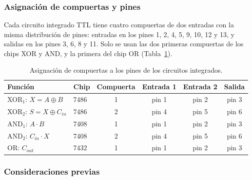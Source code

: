 \documentclass[10pt]{article}
\begin{document}
\subsubsection{Asignación de compuertas y pines}

Cada circuito integrado TTL tiene cuatro compuertas de dos entradas con la misma
distribución de pines: entradas en los pines 1, 2, 4, 5, 9, 10, 12 y 13, y
salidas en los pines 3, 6, 8 y 11. Solo se usan las dos primeras compuertas de
los chips XOR y AND, y la primera del chip OR (Tabla~\ref{tab:pines}).

\begin{table}[!htbp]
  \centering
  \caption{Asignación de compuertas a los pines de los circuitos integrados.}
  \label{tab:pines}
  \begin{tabular}{llcccc}
    \toprule
    Función & Chip & Compuerta & Entrada 1 & Entrada 2 & Salida \\
    \midrule
    XOR$_1$: $X = A \oplus B$          & 7486 & 1 & pin 1 & pin 2 & pin 3 \\
    XOR$_2$: $S = X \oplus C_{in}$     & 7486 & 2 & pin 4 & pin 5 & pin 6 \\
    AND$_1$: $A \cdot B$               & 7408 & 1 & pin 1 & pin 2 & pin 3 \\
    AND$_2$: $C_{in} \cdot X$          & 7408 & 2 & pin 4 & pin 5 & pin 6 \\
    OR: $C_{out}$                      & 7432 & 1 & pin 1 & pin 2 & pin 3 \\
    \bottomrule
  \end{tabular}
\end{table}

\subsubsection{Consideraciones previas}
\end{document}
